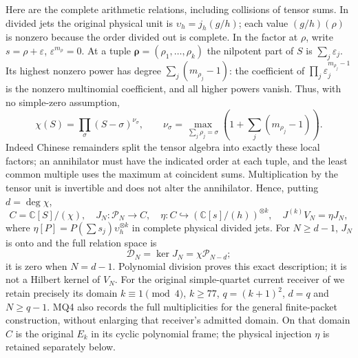 \documentclass[11pt]{article}
\newcommand{\C}{\mathbb C}
\newcommand{\DD}{\mathcal D}
\begin{document}
Here are the complete arithmetic relations, including collisions of
tensor sums. In divided jets the original physical unit is
$\upsilon_h=j_h(g/h)$; each value $(g/h)(\rho)$ is nonzero because
the order divided out is complete. In the factor at $\rho$, write
$s=\rho+\varepsilon$, $\varepsilon^{m_\rho}=0$. At a tuple
$\boldsymbol\rho=(\rho_1,\ldots,\rho_k)$ the nilpotent part of
$S$ is $\sum_j\varepsilon_j$. Its highest nonzero power has degree
$\sum_j(m_{\rho_j}-1)$: the coefficient of
$\prod_j\varepsilon_j^{m_{\rho_j}-1}$ is the nonzero multinomial
coefficient, and all higher powers vanish. Thus, with no simple-zero
assumption,
\[
 \chi(S)=\prod_\sigma(S-\sigma)^{\nu_\sigma},\qquad
 \nu_\sigma=\max_{\sum_j\rho_j=\sigma}
       \left(1+\sum_j(m_{\rho_j}-1)\right).                    \tag{MQ4}
\]
Indeed Chinese remainders split the tensor algebra into exactly
these local factors; an annihilator must have the indicated order
at each tuple, and the least common multiple uses the maximum at
coincident sums. Multiplication by the tensor unit is invertible and
does not alter the annihilator. Hence, putting $d=\deg\chi$,
\[
 C=\C[S]/(\chi),\quad J_N:\mathcal P_N\longrightarrow C,
 \quad \eta:C\hookrightarrow(\C[s]/(h))^{\otimes k},\quad
 J^{(k)}V_N=\eta J_N,                                       \tag{MQ5}
\]
where $\eta[P]=P(\sum s_j)\upsilon_h^{\otimes k}$ in complete
physical divided jets. For $N\ge d-1$, $J_N$ is onto and the full
relation space is
\[
 \DD_N=\ker J_N=\chi\mathcal P_{N-d};                         \tag{MQ6}
\]
it is zero when $N=d-1$. Polynomial division proves this exact
description; it is not a Hilbert kernel of $V_N$.
For the original simple-quartet current receiver of \cite{PD} we
retain precisely its domain $k\equiv1\pmod4$, $k\ge77$,
$q=(k+1)^2$, $d=q$ and $N\ge q-1$. MQ4 also records the full
multiplicities for the general finite-packet construction, without
enlarging that receiver's admitted domain.
On that domain $C$ is the original $E_k$ in its cyclic polynomial
frame; the physical injection $\eta$ is retained separately below.
\end{document}
